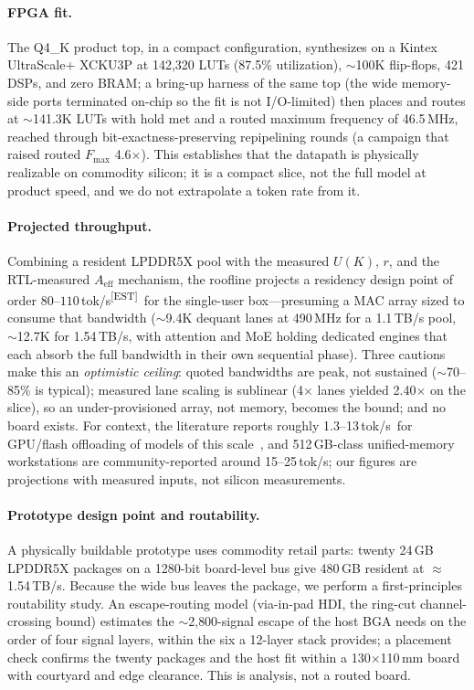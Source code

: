\documentclass[11pt]{article}
\newcommand{\est}{\textsuperscript{[EST]}}
\newcommand{\tps}{tok/s}
\begin{document}
\paragraph{FPGA fit.} The Q4\_K product top, in a compact configuration,
synthesizes on a Kintex UltraScale+ XCKU3P at 142{,}320 LUTs (87.5\%
utilization), $\sim$100K flip-flops, 421 DSPs, and zero BRAM; a bring-up
harness of the same top (the wide memory-side ports terminated on-chip so the
fit is not I/O-limited) then places and routes at $\sim$141.3K LUTs with hold
met and a routed maximum frequency of 46.5\,MHz, reached through
bit-exactness-preserving repipelining rounds (a campaign that raised routed
$F_{\max}$ 4.6$\times$). This establishes that the datapath is physically
realizable on commodity silicon; it is a compact slice, not the full model at
product speed, and we do not extrapolate a token rate from it.

\paragraph{Projected throughput.} Combining a resident LPDDR5X pool with the
measured $U(K)$, $r$, and the RTL-measured $A_{\mathrm{eff}}$ mechanism, the
roofline projects a residency design point of order $80$--$110$\,\tps\est\ for
the single-user box---presuming a MAC array sized to consume that bandwidth
($\sim$9.4K dequant lanes at 490\,MHz for a 1.1\,TB/s pool, $\sim$12.7K for
1.54\,TB/s, with attention and MoE holding dedicated engines that each absorb
the full bandwidth in their own sequential phase). Three cautions make this an
\emph{optimistic ceiling}: quoted bandwidths are peak, not sustained
($\sim$70--85\% is typical); measured lane scaling is sublinear
(4$\times$ lanes yielded 2.40$\times$ on the slice), so an under-provisioned
array, not memory, becomes the bound; and no board exists. For context, the
literature reports roughly 1.3--13\,\tps\ for GPU/flash offloading of models of
this scale~\cite{llminaflash,moeinfinity}, and 512\,GB-class unified-memory
workstations are community-reported around 15--25\,\tps; our figures are
projections with measured inputs, not silicon measurements.

\paragraph{Prototype design point and routability.} A physically buildable
prototype uses commodity retail parts: twenty 24\,GB LPDDR5X packages on a
1280-bit board-level bus give 480\,GB resident at $\approx$1.54\,TB/s. Because
the wide bus leaves the package, we perform a first-principles routability
study. An escape-routing model (via-in-pad HDI, the ring-cut channel-crossing
bound) estimates the $\sim$2{,}800-signal escape of the host BGA needs on the
order of four signal layers, within the six a 12-layer stack provides; a
placement check confirms the twenty packages and the host fit within a
130$\times$110\,mm board with courtyard and edge clearance. This is analysis,
not a routed board.
\end{document}
